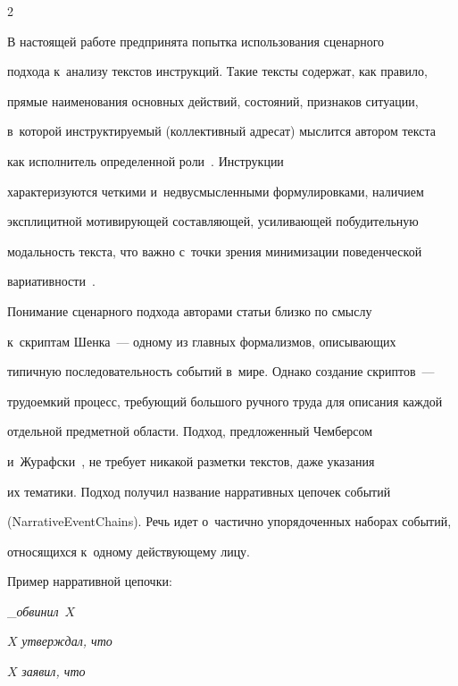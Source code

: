 \begin{multicols}{2}
  

  В настоящей работе предпринята попытка использования сценарного 

подхода к~анализу текс\-тов инструкций. Такие текс\-ты содержат, как правило, 

прямые наименования основных действий, со\-сто\-яний, признаков ситуации, 

в~которой ин\-струк\-ти\-ру\-емый (коллективный адресат) мыс\-лит\-ся автором текста 

как исполнитель определенной роли~\cite{11-sm}. Инструкции 

характеризуются чет\-ки\-ми и~недвусмысленными формулировками, наличием 

эксплицитной мо\-ти\-ви\-ру\-ющей со\-став\-ля\-ющей, уси\-ли\-ва\-ющей побудительную 

мо\-даль\-ность текс\-та, что важ\-но с~точ\-ки зрения минимизации поведенческой 

ва\-ри\-а\-тив\-ности~\cite{9-sm, 11-sm}.

   

   Понимание сценарного подхода авторами \mbox{статьи} близко по смыслу 

к~скриптам Шенка~--- одному из глав\-ных формализмов, опи\-сы\-ва\-ющих 

типичную последовательность событий в~мире. Однако создание скриптов~--- 

трудоемкий процесс, тре\-бу\-ющий большого руч\-но\-го труда для описания каж\-дой 

отдельной предметной об\-ласти. Подход, предложенный Чем\-бер\-сом  

и~Журафски~\cite{12-sm}, не требует никакой разметки текс\-тов, даже указания 

их тематики. Подход получил название нарративных цепочек событий 

(NarrativeEventChains). Речь идет о~час\-тич\-но упорядоченных наборах событий, 

относящихся к~одному дей\-ст\-ву\-юще\-му лицу. 

   

Пример нарративной цепочки:



\_\textit{обвинил}~$X$



$X$ \textit{утверждал, что}



$X$ \textit{заявил, что}




\end{multicols}
